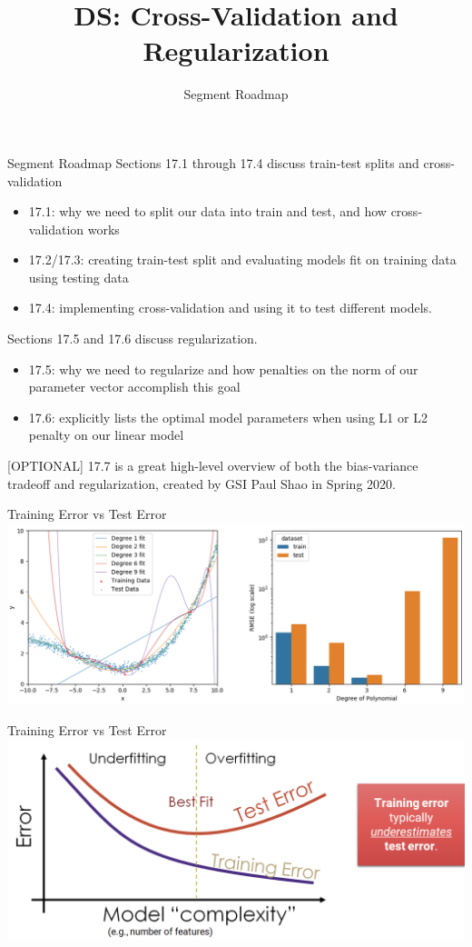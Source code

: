 \documentclass[aspectratio=169]{../latex_main/tntbeamer}  %
\title[Introduction]{DS: Cross-Validation and Regularization}
\subtitle{Segment Roadmap}
\begin{document}
	
	\maketitle
	\begin{frame}{Segment Roadmap}
	    Sections 17.1 through 17.4 discuss train-test splits and cross-validation
	    \begin{itemize}
	        \item 17.1: why we need to split our data into train and test, and how cross-validation works
	        \item 17.2/17.3: creating train-test split and evaluating models fit on training data using testing data
	        \item 17.4: implementing cross-validation and using it to test different models.
	    \end{itemize}
	    Sections 17.5 and 17.6 discuss regularization.
	    \begin{itemize}
	        \item 17.5: why we need to regularize and how penalties on the norm of our parameter vector accomplish this goal
	        \item 17.6: explicitly lists the optimal model parameters when using L1 or L2 penalty on our linear model
	    \end{itemize}
	    [OPTIONAL] 17.7 is a great high-level overview of both the bias-variance tradeoff and regularization, created by GSI Paul Shao in Spring 2020.
	\end{frame}
	
	
		\begin{frame}{Training Error vs Test Error}
	    \includegraphics[scale=.4]{Bild1}
	\end{frame}
	
	
	\begin{frame}{Training Error vs Test Error}
	    \includegraphics[scale=.4]{Bild2}
	\end{frame}
	
\end{document}
